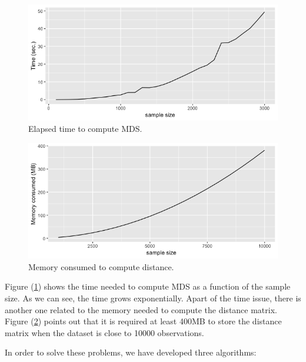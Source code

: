 \documentclass[11pt]{report}
\begin{document}
 
\begin{figure}[ht]
\centering
    \includegraphics[scale = 0.5]{./images/elapsed_time_mds.png}
    \caption{Elapsed time to compute MDS.}
    \label{elapsed_time_mds}
\end{figure}



\begin{figure}[ht]
\centering
\includegraphics[scale = 0.5]{./images/memory_distance.png}
\caption{Memory consumed to compute distance.}
\label{memory_distance}
\end{figure}


\indent Figure (\ref{elapsed_time_mds}) shows the time needed to compute MDS
as a function of the sample size. As we can see, the time grows 
exponentially. Apart of the time issue, there is another one related to the
memory needed to compute the distance matrix. Figure (\ref{memory_distance}) 
points out that it is required at least 400MB to store the distance 
matrix when the dataset is close to 10000 observations.

\indent In order to solve these problems, we have developed three algorithms:
\end{document}
